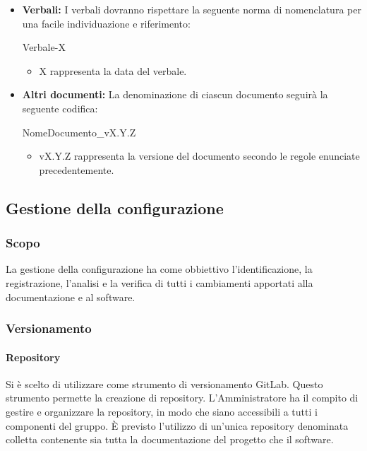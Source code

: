 \documentclass[11pt,a4paper]{article}
\begin{document}
{	\begin{itemize}
		\item \textbf{Verbali:} I verbali dovranno rispettare la seguente norma di nomenclatura per una facile individuazione e riferimento:
		\begin{center}
			Verbale-X
		\end{center}
		
		\begin{itemize}
			\item X rappresenta la data del verbale.
		\end{itemize}
		
		\item \textbf{Altri documenti:} La denominazione di ciascun documento seguirà la seguente codifica:
		\begin{center}
			NomeDocumento\_vX.Y.Z
		\end{center}
		
		\begin{itemize}
			\item vX.Y.Z rappresenta la versione del documento secondo le regole enunciate precedentemente.
		\end{itemize}
		
	\end{itemize}
	
	\newpage

\subsection{Gestione della configurazione}
\subsubsection{Scopo}
La gestione della configurazione ha come obbiettivo l'identificazione, la registrazione, l'analisi e la verifica di tutti i cambiamenti apportati alla documentazione e al software.
\subsubsection{Versionamento}
\paragraph{Repository}
Si è scelto di utilizzare come strumento di versionamento GitLab. Questo strumento permette la creazione di repository.
L'Amministratore ha il compito di gestire e organizzare la repository, in modo che siano accessibili a tutti i componenti del gruppo.
È previsto l'utilizzo di un'unica repository denominata colletta contenente sia tutta la documentazione del progetto che il software.
}
\end{document}
